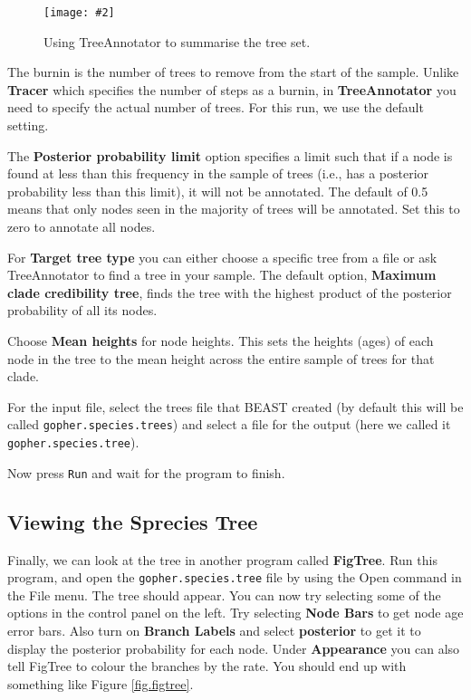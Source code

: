 \documentclass{article}
\newcommand{\includeimage}[2][]{%
\texttt{[image: \#2]}
}
\begin{document}
\begin{figure}
\centering
\includeimage[scale=0.4]{figures/TreeAnnotator}

\caption{\label{fig.TreeAnnotator} Using TreeAnnotator to summarise the tree set.}
\end{figure}


The burnin is the number of trees to remove from the start of the sample. Unlike {\bf Tracer} which specifies the number of steps as a burnin, in {\bf TreeAnnotator} you need to specify the actual number of trees. For this run, we use the default setting.

The {\bf Posterior probability limit} option specifies a limit such that if a node is found at less than this frequency in the sample of trees (i.e., has a posterior probability less than this limit), it will not be annotated. The default of 0.5 means that only nodes seen in the majority of trees will be annotated. Set this to zero to annotate all nodes.

For {\bf Target tree type} you can either choose a specific tree from a file or ask TreeAnnotator to find a tree in your sample. The default option, {\bf Maximum clade credibility tree}, finds the tree with the highest product of the posterior probability of all its nodes.

Choose {\bf Mean heights} for node heights. This sets the heights (ages) of each node in the tree to the mean height across the entire sample of trees for that clade.

For the input file, select the trees file that BEAST created (by default this will be called \texttt{gopher.species.trees}) and select a file for the output (here we called it \texttt{gopher.species.tree}).

Now press \texttt{Run} and wait for the program to finish.

\subsection*{Viewing the Sprecies Tree}

Finally, we can look at the tree in another program called {\bf FigTree}. Run this program, and open
the \texttt{gopher.species.tree} file by using the Open command in the File menu. The tree should appear.
You can now try selecting some of the options in the control panel on the left. Try selecting
{\bf Node Bars} to get node age error bars. Also turn on {\bf Branch Labels} and select {\bf posterior} to get
it to display the posterior probability for each node. Under {\bf Appearance} you can also tell FigTree
to colour the branches by the rate.
You should end up with something like Figure \ref{fig.figtree}.
\end{document}
